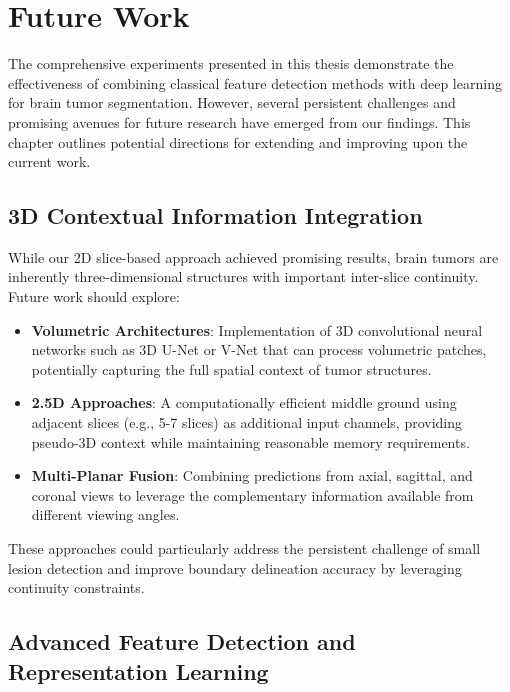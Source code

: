 
\chapter{Future Work}
\label{chap:future_work}

The comprehensive experiments presented in this thesis demonstrate the effectiveness of combining classical feature detection methods with deep learning for brain tumor segmentation. However, several persistent challenges and promising avenues for future research have emerged from our findings. This chapter outlines potential directions for extending and improving upon the current work.

\section{3D Contextual Information Integration}

While our 2D slice-based approach achieved promising results, brain tumors are inherently three-dimensional structures with important inter-slice continuity. Future work should explore:

\begin{itemize}
    \item \textbf{Volumetric Architectures}: Implementation of 3D convolutional neural networks such as 3D U-Net or V-Net that can process volumetric patches, potentially capturing the full spatial context of tumor structures.
    
    \item \textbf{2.5D Approaches}: A computationally efficient middle ground using adjacent slices (e.g., 5-7 slices) as additional input channels, providing pseudo-3D context while maintaining reasonable memory requirements.
    
    \item \textbf{Multi-Planar Fusion}: Combining predictions from axial, sagittal, and coronal views to leverage the complementary information available from different viewing angles.
\end{itemize}

These approaches could particularly address the persistent challenge of small lesion detection and improve boundary delineation accuracy by leveraging continuity constraints.

\section{Advanced Feature Detection and Representation Learning}

